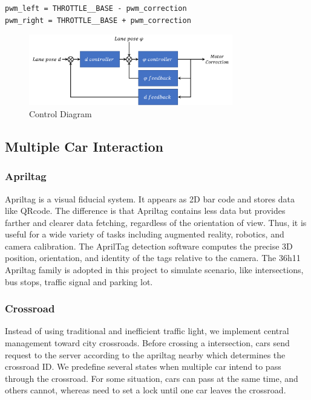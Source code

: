 \documentclass[conference]{IEEEtran}
\begin{document}
\begin{lstlisting}
pwm_left = THROTTLE__BASE - pwm_correction
pwm_right = THROTTLE__BASE + pwm_correction
\end{lstlisting}

\begin{figure}
\centering
\includegraphics[width=3.5in]{img/controller.png}
\caption{Control Diagram}
\label{fig:controller}
\end{figure}

\subsection{Multiple Car Interaction}

\subsubsection{Apriltag}

Apriltag is a visual fiducial system. It appears as 2D bar code and stores data like QRcode. The difference is that Apriltag contains less data but provides farther and clearer data fetching, regardless of the orientation of view. Thus, it is useful for a wide variety of tasks including augmented reality, robotics, and camera calibration. The AprilTag detection software computes the precise 3D position, orientation, and identity of the tags relative to the camera. The 36h11 Apriltag family is adopted in this project to simulate scenario, like intersections, bus stops, traffic signal and parking lot.

\subsubsection{Crossroad}

Instead of using traditional and inefficient traffic light, we implement central management toward city crossroads. Before crossing a intersection, cars send request to the server according to the apriltag nearby which determines the crossroad ID. We predefine several states when multiple car intend to pass through the crossroad. For some situation, cars can pass at the same time, and others cannot, whereas need to set a lock until one car leaves 	the crossroad.
\end{document}
